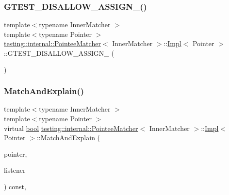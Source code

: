 \subsubsection{\texorpdfstring{G\+T\+E\+S\+T\+\_\+\+D\+I\+S\+A\+L\+L\+O\+W\+\_\+\+A\+S\+S\+I\+G\+N\+\_\+()}{GTEST\_DISALLOW\_ASSIGN\_()}}
{\footnotesize\ttfamily template$<$typename Inner\+Matcher $>$ \\
template$<$typename Pointer $>$ \\
\hyperlink{classtesting_1_1internal_1_1PointeeMatcher}{testing\+::internal\+::\+Pointee\+Matcher}$<$ Inner\+Matcher $>$\+::\hyperlink{classtesting_1_1internal_1_1PointeeMatcher_1_1Impl}{Impl}$<$ Pointer $>$\+::G\+T\+E\+S\+T\+\_\+\+D\+I\+S\+A\+L\+L\+O\+W\+\_\+\+A\+S\+S\+I\+G\+N\+\_\+ (\begin{DoxyParamCaption}\item[{\hyperlink{classtesting_1_1internal_1_1PointeeMatcher_1_1Impl}{Impl}$<$ Pointer $>$}]{ }\end{DoxyParamCaption})\hspace{0.3cm}{\ttfamily [private]}}

\mbox{\label{classtesting_1_1internal_1_1PointeeMatcher_1_1Impl_a2aeaf0b7284fb2c7a7745746ec6ce63b}} 
\subsubsection{\texorpdfstring{Match\+And\+Explain()}{MatchAndExplain()}}
{\footnotesize\ttfamily template$<$typename Inner\+Matcher $>$ \\
template$<$typename Pointer $>$ \\
virtual \hyperlink{classbool}{bool} \hyperlink{classtesting_1_1internal_1_1PointeeMatcher}{testing\+::internal\+::\+Pointee\+Matcher}$<$ Inner\+Matcher $>$\+::\hyperlink{classtesting_1_1internal_1_1PointeeMatcher_1_1Impl}{Impl}$<$ Pointer $>$\+::Match\+And\+Explain (\begin{DoxyParamCaption}\item[{Pointer}]{pointer,  }\item[{\hyperlink{classtesting_1_1MatchResultListener}{Match\+Result\+Listener} $\ast$}]{listener }\end{DoxyParamCaption}) const\hspace{0.3cm}{\ttfamily [inline]}, {\ttfamily [virtual]}}



